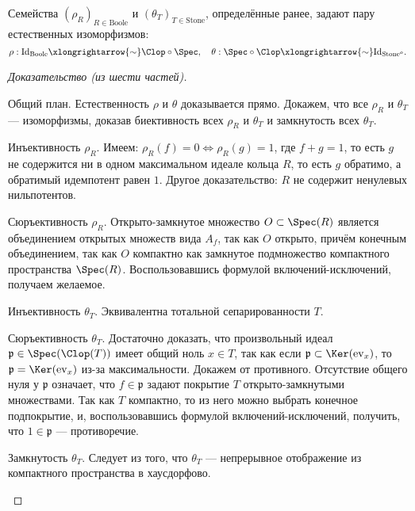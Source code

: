 \documentclass[
	extrafontsizes,
	11pt,
	hyphens,
]{memoir}
\begin{document}
\begin{theorem}
Семейства
\(
(\rho_R)_{R \in \mathrm{Boole}}
\)
и
\(
(\theta_T)_{T \in \mathrm{Stone}}
\),
определённые ранее,
задают пару естественных изоморфизмов:
\[
\rho: \mathrm{Id}_{\mathrm{Boole}} 
\xlongrightarrow{\sim}
\Clop \circ \Spec,
\quad
\theta: \Spec \circ \Clop
\xlongrightarrow{\sim}
\mathrm{Id}_{\mathrm{Stone}^{o}}.
\]
\end{theorem}

\begin{proof}[Доказательство (из шести частей)]
~\begin{proofdescription}

\item[Общий план.]
Естественность $\rho$ и $\theta$ доказывается прямо. Докажем, что все $\rho_R$ и $\theta_T$ --- изоморфизмы, доказав биективность всех $\rho_R$ и $\theta_T$ и замкнутость всех $\theta_T$.

\item[Инъективность ${\rho_R}$.]
Имеем: $\rho_R(f) = 0 \iff \rho_R(g) = 1$, где $f+g=1$, то есть $g$ не содержится ни в одном максимальном идеале кольца $R$, то есть $g$ обратимо, а обратимый идемпотент равен $1$. Другое доказательство: $R$ не содержит ненулевых нильпотентов.

\item[Сюръективность ${\rho_R}$.]
Открыто-замкнутое
множество
$O \subset \Spec(R)$ является объединением открытых множеств вида $A_f$, так как $O$ открыто, причём конечным объединением, так как $O$ компактно как замкнутое подмножество компактного пространства $\Spec(R)$.
Воспользовавшись формулой включений-ис\-клю\-че\-ний, получаем желаемое.

\item[Инъективность ${\theta_T}$.]
Эквивалентна тотальной сепарированности $T$.

\item[Сюръективность ${\theta_T}$.]
Достаточно доказать, что произвольный
идеал
$\mathfrak{p} \in \Spec(\Clop(T))$ имеет общий ноль $x \in T$, так как
если \(\mathfrak{p} \subset \Ker(\mathrm{ev}_x)\),
то \(\mathfrak{p} = \Ker(\mathrm{ev}_x)\)
из-за максимальности. Докажем от противного. Отсутствие общего нуля у $\mathfrak{p}$ означает, что $f \in \mathfrak{p}$ задают покрытие $T$ открыто-замкнутыми множествами. Так как $T$ компактно, то из него можно выбрать конечное подпокрытие, и, воспользовавшись формулой вклю\-че\-ний-ис\-клю\-че\-ний, получить, что $1 \in \mathfrak{p}$ --- противоречие.

\item[Замкнутость ${\theta_T}$.] Следует из того, что $\theta_T$ --- непрерывное отображение из компактного пространства в хаусдорфово.
\qedhere

\end{proofdescription}

\end{proof}
\end{document}
